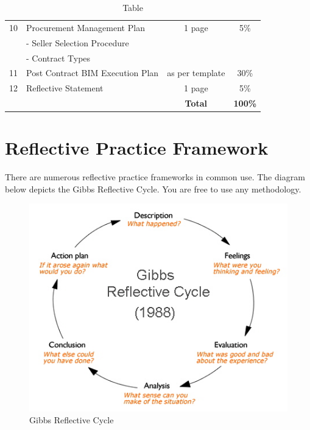 \begin{table}[ht]
\begin{tabular}{|c|l|c|c|}
		10  & Procurement Management Plan &  1 page  & 5\% \\
   			&	- Seller Selection Procedure  & & \\
   			&	- Contract Types  & & \\
		\hline

		11  & Post Contract BIM Execution Plan &  as per template  & 30\% \\
		\hline
		12  & Reflective Statement &  1 page  & 5\% \\
		
		
		\hline
		\hline
        & & \textbf{Total} & \textbf{100\%} \\
		\hline
	
	\end{tabular}
	\caption{Table }
	\label{tab:AM}
\end{table}


\newpage

\section*{Reflective Practice Framework}

There are numerous reflective practice frameworks in common use.  The diagram below depicts the Gibbs Reflective Cycle.  You are free to use any methodology.


\begin{figure}[h!]
	\centering
	\includegraphics[width=1.0\linewidth]{img/gibbs-diagram}
	\caption{Gibbs Reflective Cycle}
	\label{fig:gibbs-diagram}
\end{figure}




